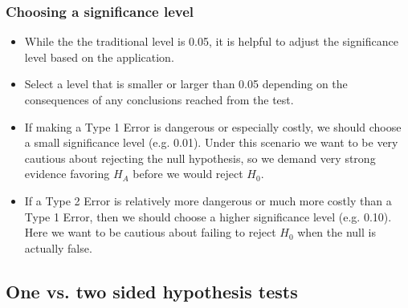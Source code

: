 \documentclass[t,compress,mathserif]{beamer}
\begin{document}
\begin{frame}
\frametitle{Choosing a significance level}

\begin{itemize}

\item While the the traditional level is 0.05, it is helpful to adjust the significance level based on the application. 

\item Select a level that is smaller or larger than 0.05 depending on the consequences of any conclusions reached from the test.

\item If making a Type 1 Error is dangerous or especially costly, we should choose a small significance level (e.g. 0.01). Under this scenario we want to be very cautious about rejecting the null hypothesis, so we demand very strong evidence favoring $H_A$ before we would reject $H_0$.

\item If a Type 2 Error is relatively more dangerous or much more costly than a Type 1 Error, then we should choose a higher significance level (e.g. 0.10). Here we want to be cautious about failing to reject $H_0$ when the null is actually false.

\end{itemize}

\end{frame}


\subsection{One vs. two sided hypothesis tests}

\end{document}
